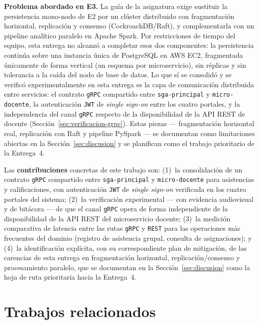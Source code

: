 \documentclass[12pt,a4paper]{article}
\begin{document}
\textbf{Problema abordado en E3.} La guía de la asignatura exige sustituir
la persistencia mono-nodo de E2 por un clúster distribuido con
fragmentación horizontal, replicación y consenso (CockroachDB/Raft), y
complementarla con un pipeline analítico paralelo en Apache Spark. Por
restricciones de tiempo del equipo, esta entrega no alcanzó a
completar esos dos componentes: la persistencia continúa sobre una
instancia única de PostgreSQL en AWS EC2, fragmentada únicamente de forma
vertical (un esquema por microservicio), sin réplicas y sin tolerancia a
la caída del nodo de base de datos. Lo que sí se consolidó y se verificó
experimentalmente en esta entrega es la capa de comunicación distribuida
entre servicios: el contrato \texttt{gRPC} compartido entre
\texttt{sga-principal} y \texttt{micro-docente}, la autenticación
\texttt{JWT} de \emph{single sign-on} entre los cuatro portales, y la
independencia del canal \texttt{gRPC} respecto de la disponibilidad de la
API REST de docente (Sección~\ref{sec:verificacion-grpc}). Estas piezas
--- fragmentación horizontal real, replicación con Raft y pipeline
PySpark --- se documentan como limitaciones abiertas en la
Sección~\ref{sec:discusion} y se planifican como el trabajo prioritario
de la Entrega~4.

Las \textbf{contribuciones} concretas de este trabajo son: (1)~la
consolidación de un contrato \texttt{gRPC} compartido entre
\texttt{sga-principal} y \texttt{micro-docente} para asistencias y
calificaciones, con autenticación \texttt{JWT} de \emph{single sign-on}
verificada en los cuatro portales del sistema; (2)~la verificación
experimental --- con evidencia audiovisual y de bitácora --- de que el
canal \texttt{gRPC} opera de forma independiente de la disponibilidad de
la API REST del microservicio docente; (3)~la medición comparativa de
latencia entre las rutas \texttt{gRPC} y \texttt{REST} para las
operaciones más frecuentes del dominio (registro de asistencia grupal,
consulta de asignaciones); y (4)~la identificación explícita, con su
correspondiente plan de mitigación, de las carencias de esta entrega en
fragmentación horizontal, replicación/consenso y procesamiento paralelo,
que se documentan en la Sección~\ref{sec:discusion} como la hoja de ruta
prioritaria hacia la Entrega~4.


\section{Trabajos relacionados}
\label{sec:trabajos-relacionados}
\end{document}
